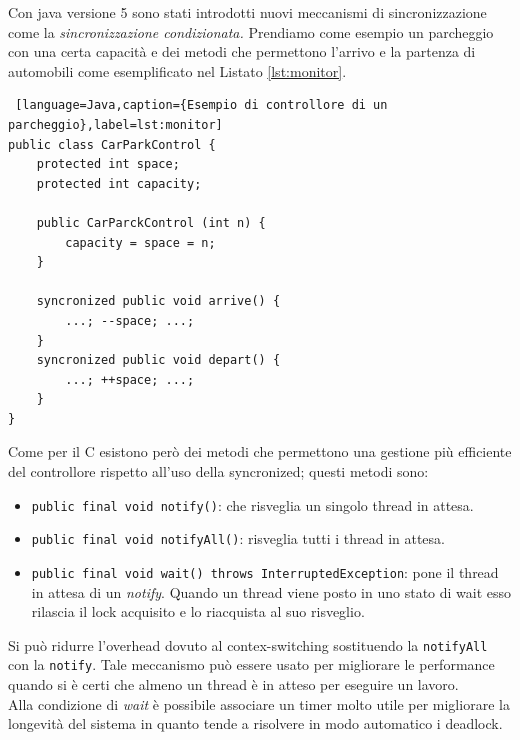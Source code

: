 Con java versione 5 sono stati introdotti nuovi meccanismi di sincronizzazione come la \emph{sincronizzazione condizionata.} Prendiamo come esempio un parcheggio con una certa capacità e dei metodi che permettono l'arrivo e la partenza di automobili come esemplificato nel  Listato \ref{lst:monitor}.
\begin{lstlisting} [language=Java,caption={Esempio di controllore di un parcheggio},label=lst:monitor]
public class CarParkControl {
	protected int space;
	protected int capacity;
	
	public CarParckControl (int n) {
		capacity = space = n;
	}
	
	syncronized public void arrive() {
		...; --space; ...;
	}
	syncronized public void depart() {
		...; ++space; ...;
	}
}
\end{lstlisting}
Come per il C esistono però dei metodi che permettono una gestione più efficiente del controllore rispetto all'uso della syncronized; questi metodi sono:
\begin{itemize}
\item \texttt{public final void notify()}: che risveglia un singolo thread in attesa.
\item \texttt{public final void notifyAll()}: risveglia tutti i thread in attesa.
\item \texttt{public final void wait() throws InterruptedException}: pone il thread in attesa di un \emph{notify}. Quando un thread viene posto in uno stato di wait esso rilascia il lock acquisito e lo riacquista al suo risveglio.
\end{itemize}

Si può ridurre l'overhead dovuto al contex-switching sostituendo la \texttt{notifyAll} con la \texttt{notify}. Tale meccanismo può essere usato per migliorare le performance quando si è certi che almeno un thread è in atteso per eseguire un lavoro.\\
Alla condizione di \emph{wait} è possibile associare un timer molto utile per migliorare la longevità del sistema in quanto tende a risolvere in modo automatico i deadlock.